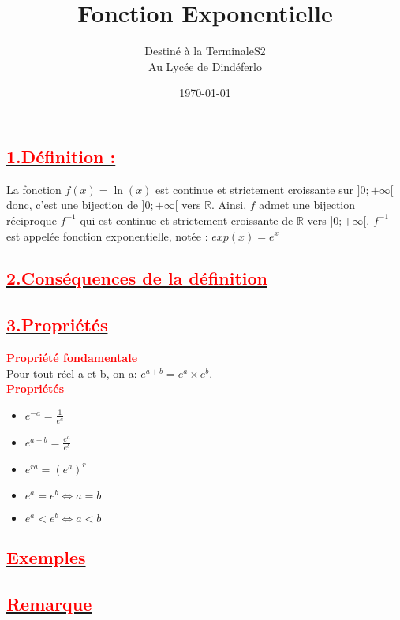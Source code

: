 \documentclass[12pt]{article}
\author{Destiné à la TerminaleS2\\Au Lycée de Dindéferlo}
\title{\textbf{Fonction Exponentielle}}
\date{\today}
\begin{document}
\maketitle
\newpage
\subsection*{\underline{\textbf{\textcolor{red}{1.Définition :}}}}
La fonction \( f(x) = \ln(x) \) est continue et strictement croissante sur \( ]0; +\infty[ \) donc, c'est une bijection de \( ]0; +\infty[ \) vers \( \mathbb{R} \). Ainsi, \( f \) admet une bijection réciproque \( f^{-1} \) qui est continue et strictement croissante de \( \mathbb{R} \) vers \( ]0; +\infty[ \). \( f^{-1} \) est appelée fonction exponentielle, notée : $exp(x)=e^{x}$
\subsection*{\underline{\textbf{\textcolor{red}{2.Conséquences de la définition}}}}
\subsection*{\underline{\textbf{\textcolor{red}{3.Propriétés}}}}
\textbf{\textcolor{red}{Propriété fondamentale}}\\
Pour tout réel a et b, on a: $e^{a+b}=e^{a} \times e^{b}$.\\
\textbf{\textcolor{red}{Propriétés}}\\
\begin{itemize}
    \item \textbf{} \(e^{-a}=\frac{1}{e^{a}}\)
    \item \textbf{} \(e^{a-b}=\frac{e^{a}}{e^{b}}\)
    \item \textbf{} \(e^{ra}=(e^{a})^{r}\)
    \item \textbf{} \(e^{a}=e^{b} \Leftrightarrow a=b\)
    \item \textbf{} \(e^{a}<e^{b} \Leftrightarrow a<b\)
\end{itemize}
\subsection*{\underline{\textbf{\textcolor{red}{Exemples}}}}
\subsection*{\underline{\textbf{\textcolor{red}{Remarque}}}}
\end{document}

